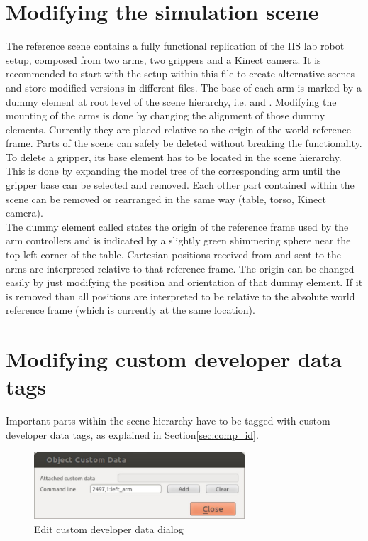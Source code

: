 \section{Modifying the simulation scene}

The reference scene contains a fully functional replication of the IIS lab robot setup, composed from two arms, two grippers and a Kinect camera. It is recommended to start with the setup within this file to create alternative scenes and store modified versions in different files. The base of each arm is marked by a dummy element at root level of the scene hierarchy, i.e.  and . Modifying the mounting of the arms is done by changing the alignment of those dummy elements. Currently they are placed relative to the origin of the world reference frame. Parts of the scene can safely be deleted without breaking the functionality. To delete a gripper, its base element has to be located in the scene hierarchy. This is done by expanding the model tree of the corresponding arm until the gripper base  can be selected and removed. Each other part contained within the scene can be removed or rearranged in the same way (table, torso, Kinect camera).\\

The dummy element called  states the origin of the reference frame used by the arm controllers and is indicated by a slightly green shimmering sphere near the top left corner of the table. Cartesian positions received from and sent to the arms are interpreted relative to that reference frame. The origin can be changed easily by just modifying the position and orientation of that dummy
element. If it is removed than all positions are interpreted to be relative to the absolute world reference frame (which is currently at the same location).

\section{Modifying custom developer data tags}

Important parts within the scene hierarchy have to be tagged with custom developer data tags, as explained in Section\ref{sec:comp_id}.
\begin{figure}[h]
	\centering
  	\includegraphics[width=0.7\textwidth]{images/dlg_cust_data.jpg}
	\caption{Edit custom developer data dialog}
	\label{fig:change_dev_data}
\end{figure} 

